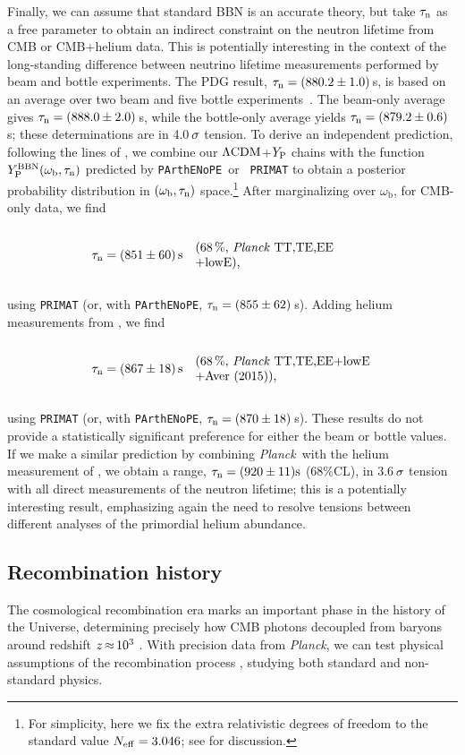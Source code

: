 \documentclass[longauth,traditabstract]{aa}
\def\Planck{\textit{Planck}}
\def\,{\thinspace}
\newcommand{\leftparbox}[2]{\parbox{#1}{\begin{flushleft} #2 \end{flushleft}}}
\newcommand{\oneonesig}[4][5cm]{
\begin{equation}
\left.
  #2 \quad\mbox{\text{\leftparbox{#1}{(68\,\%,~#3)#4}}}
  \right.
\end{equation}
}
\newcommand{\mksym}[1]{\ifmmode {\rm #1}\else #1\fi}
\newcommand{\dataplus}{\allowbreak+}
\newcommand{\TTTEEE}{\mksym{TT,TE,EE}}
\newcommand{\planckTTTEEEonly}{\planck\ \TTTEEE}
\newcommand{\lowE}{\mksym{lowE}}
\newcommand{\parthenope}{{\tt PArthENoPE}}
\newcommand{\planckall}{\planckTTTEEEonly\dataplus\lowE}
\newcommand{\lcdm}{\texorpdfstring{{$\rm{\Lambda CDM}$}}{ΛCDM}}
\newcommand{\yhe}{Y_{\text{P}}}
\newcommand{\ypbbn}{Y_{\text{P}}^{\rm BBN}}
\newcommand{\taun}{\tau_{\rm n}}
\newcommand{\nnu}{N_{\rm eff}}
\providecommand{\text}[1]{\rm{#1}}
\providecommand{\omb}{\omega_{\mathrm{b}}}
\def\beglet{
  \addtocounter{equation}{1}%
  \setcounter{parentequation}{\value{equation}}%
  \setcounter{equation}{0}%
  \def\theequation{\arabic{parentequation}\alph{equation}}%
  \ignorespaces
}
\def\endlet{
  \setcounter{equation}{\value{parentequation}}%
  \def\theequation{\arabic{equation}}%
}
\providecommand{\beglet}{\begin{subequations}}
\providecommand{\endlet}{\end{subequations}}
\newcommand{\planck}{\Planck}
\begin{document}
Finally, we can assume that standard BBN is an accurate theory, but
take $\taun$ as a free parameter to obtain an indirect constraint on
the neutron lifetime from CMB or CMB+helium data. This is potentially
interesting in the context of the long-standing difference between
neutrino lifetime measurements performed by beam and bottle
experiments. The PDG result, $\taun = (880.2\pm 1.0)\,$s, is based on
an average over two beam and five bottle
experiments~\citep{Patrignani:2016xqp}. The beam-only average gives
$\taun = (888.0\pm 2.0)\,$s, while the bottle-only average yields
$\taun = (879.2\pm 0.6)\,$s; these determinations are in 4.0$\,\sigma$
tension. To derive an independent prediction, following the lines
of \cite{Salvati:2015wxa}, we combine our \lcdm+$\yhe$ chains with the
function $\ypbbn(\omb, \taun)$ predicted by \parthenope\ or {\tt
PRIMAT} to obtain a posterior probability distribution in
$(\omb, \taun)$ space.\footnote{For simplicity, here we fix the extra
relativistic degrees of freedom to the standard value $\nnu=3.046$;
see \cite{Salvati:2015wxa} for discussion.} After marginalizing over
$\omb$, for CMB-only data, we find
\beglet
\oneonesig{\taun = (851 \pm 60)\,\mathrm{s}}{\planckall}{,}
using {\tt PRIMAT} (or, with \parthenope, $\taun = (855\pm62)\,$s).
Adding helium measurements from \citet{Aver:2015iza}, we find
\oneonesig{\taun = (867 \pm 18)\,\mathrm{s}}{\planckall\dataplus{\rm Aver (2015)}}{,}
\endlet
using {\tt PRIMAT} (or, with \parthenope, $\taun = (870\pm18)\,$s).
These results do not provide a statistically significant preference for either the
beam or bottle values.
If we make a similar prediction by combining \Planck\ with the helium measurement of \cite{Izotov:2014fga}, we obtain a range, $\taun = (920\pm11)\mathrm{s}$ (68\,\%CL), in 3.6$\,\sigma$ tension with all direct measurements of the neutron lifetime; this is a potentially interesting result, emphasizing again the need to
resolve tensions between different analyses of the primordial helium abundance.

\subsection{Recombination history}\label{sec:recombination}
\label{sec:projections_mu}
The cosmological recombination era marks an important phase in the
history of the Universe, determining precisely how CMB photons
decoupled from baryons around redshift
$z\,{\approx}\,10^3$ \citep{Sunyaev1970, Peebles1970}. With precision
data from \Planck, we can test physical assumptions of the
recombination process \citep{Hu1995, Seljak2003}, studying both
standard and non-standard physics.
\end{document}
